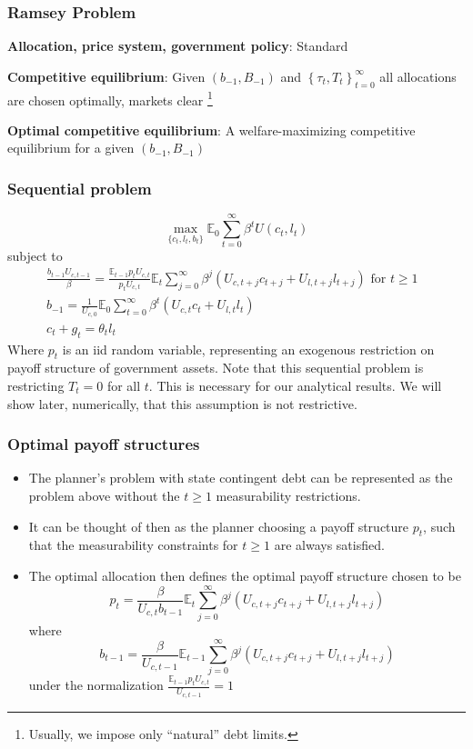 \documentclass{beamer}
\newcommand{\EE}{\mathbb E}
\begin{document}
\begin{frame}
 \frametitle{Ramsey Problem}

\begin{definition}
\textbf{Allocation, price system, government policy}: Standard

\end{definition}

\begin{definition}
\textbf{Competitive equilibrium}: Given $\left(b_{-1},B_{-1}\right) $ and $\left\{ \tau _{t},T_{t}\right\} _{t=0}^{\infty }$
all allocations are chosen optimally, markets clear \footnote{Usually, we impose only  ``natural'' debt limits. }
\end{definition}

\begin{definition}
\textbf{Optimal competitive equilibrium}: A welfare-maximizing competitive
equilibrium for a given $\left( b_{-1},B_{-1}\right) $
\end{definition}

 \end{frame}
 
 
 \begin{frame}
 \frametitle{Sequential problem}  
\[
	\max_{\{c_t,l_t,b_t\}} \EE_0\sum_{t=0}^\infty \beta^t U(c_t,l_t)
\]subject to
\begin{align*}
	\frac{b_{t-1}U_{c,t-1}}{\beta} = \frac{\EE_{t-1} p_t U_{c,t}}{p_t U_{c,t}}\EE_t\sum_{j=0}^\infty\beta^j\left( U_{c,t+j}c_{t+j}+U_{l,t+j}l_{t+j}\right)\text{  for $t\geq 1$ }\\
	b_{-1} = \frac1{U_{c,0}}\EE_0\sum_{t=0}^\infty \beta^t\left(U_{c,t}c_t+U_{l,t}l_t\right)\\
	c_t + g_t = \theta_t l_t
\end{align*}
Where $p_t$ is an iid random variable, representing an exogenous restriction on payoff structure of government assets.  Note that this sequential problem is restricting $T_t = 0$ for all $t$.  This is necessary for our analytical results.  We will show later, numerically, that this assumption is not restrictive.
  \end{frame}
  
 \begin{frame}
\frametitle{Optimal payoff structures}
\begin{itemize}
\item The planner's problem with state contingent debt can be represented as the problem above without the $t\geq1$ measurability restrictions.
\item  It can be thought of then as the planner choosing a payoff structure $p_t$, such that the measurability constraints for $t\geq 1$ are always satisfied.
\item  The optimal allocation then defines the optimal payoff structure chosen to be
\[
	p_t = \frac{\beta}{U_{c,t}b_{t-1}}\EE_t\sum_{j=0}^\infty\beta^j\left(U_{c,t+j}c_{t+j}+U_{l,t+j}l_{t+j}\right)
\]where
\[
	b_{t-1} = \frac{\beta}{U_{c,t-1}}\EE_{t-1}\sum_{j=0}^\infty\beta^j\left(U_{c,t+j}c_{t+j}+U_{l,t+j}l_{t+j}\right)
\]under the normalization $\frac{\EE_{t-1} p_t U_{c,t}}{U_{c,t-1}} = 1$
\end{itemize}
\end{frame} 
\end{document}
